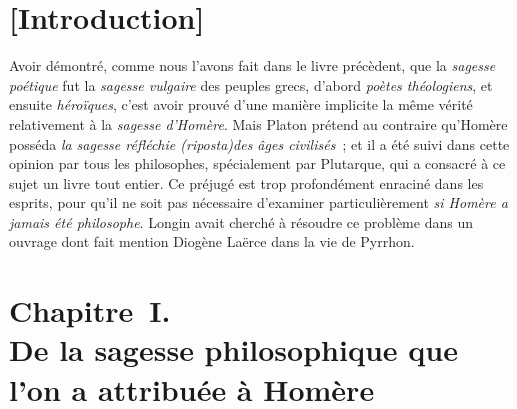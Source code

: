 \documentclass[french,twoside]{book} %
\newcommand\chapteropen{} %
\newcommand\chaptercont{} %
\newcommand\chapterclose{} %
\begin{document}
\chapteropen
\chapter[{[Introduction]}]{[Introduction]}

\chaptercont
\noindent  Avoir démontré, comme nous l’avons fait dans le livre précèdent, que la {\itshape sagesse poétique} fut la {\itshape sagesse vulgaire} des peuples grecs, d’abord {\itshape poètes théologiens}, et ensuite {\itshape héroïques}, c’est avoir prouvé d’une manière implicite la même vérité relativement à la {\itshape sagesse d’Homère}. Mais Platon prétend au contraire qu’Homère posséda \emph{{\itshape la sagesse réfléchie} ({\itshape riposta}){\itshape  des âges civilisés}} ; et il a été suivi dans cette opinion par tous les philosophes, spécialement par Plutarque, qui a consacré à ce sujet un livre tout entier. Ce préjugé est trop profondément enraciné dans les esprits, pour qu’il ne soit pas nécessaire d’examiner particulièrement {\itshape si Homère a jamais été philosophe}. Longin avait cherché à résoudre ce problème dans un ouvrage dont fait mention Diogène Laërce dans la vie de Pyrrhon.
\chapterclose


\chapteropen
\chapter[{Chapitre I. De la sagesse philosophique que l’on a attribuée à Homère}]{Chapitre I. \\
De la sagesse philosophique que l’on a attribuée à Homère}
\end{document}
